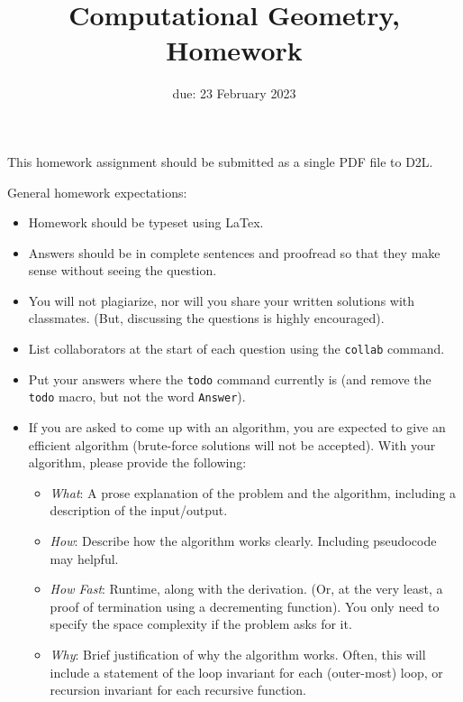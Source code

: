 \documentclass{article}
\title{Computational Geometry, Homework \hwnum}
\date{due: 23 February 2023}
\author{\todo{Your Name Here}}
\begin{document}
\maketitle

This homework assignment should be
submitted as a single PDF file to D2L.

General homework expectations:
\begin{itemize}
    \item Homework should be typeset using LaTex.
    \item Answers should be in complete sentences and proofread so that they
        make sense without seeing the question.
    \item You will not plagiarize, nor will you share your written solutions
        with classmates. (But, discussing the questions is highly encouraged).
    \item List collaborators at the start of each question using the
        \texttt{collab} command.
    \item Put your answers where the \texttt{todo} command currently is (and
        remove the \texttt{todo} macro, but not the word \texttt{Answer}).
    \item If you are asked to come up with an algorithm, you are
        expected to give an efficient algorithm (brute-force solutions will not
        be accepted). With your algorithm, please provide the following:
        \begin{itemize}
            \item \emph{What}: A prose explanation of the problem and the algorithm,
                including a description of the input/output.
            \item \emph{How}: Describe how the algorithm works clearly.
                Including pseudocode may helpful.
            \item \emph{How Fast}: Runtime, along with the derivation.  (Or, at
                the very least, a proof of termination using a decrementing
                function).  You only need to specify the space complexity if the
                problem asks for it.
           \item \emph{Why}: Brief justification of why the algorithm works.
               Often, this will include a statement of the loop invariant for each
               (outer-most) loop, or recursion invariant for each recursive function.
        \end{itemize}
\end{itemize}
\end{document}
